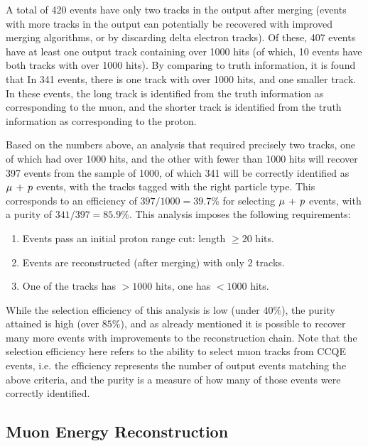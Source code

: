 A total of 420 events have only two tracks in the output after merging (events with more tracks in the output can potentially be recovered with improved merging algorithms, or by discarding delta electron tracks). Of these, 407 events have at least one output track containing over 1000 hits (of which, 10 events have both tracks with over 1000 hits). By comparing to truth information, it is found that In 341 events, there is one track with over 1000 hits, and one smaller track. In these events, the long track is identified from the truth information as corresponding to the muon, and the shorter track is identified from the truth information as corresponding to the proton.

Based on the numbers above, an analysis that required precisely two tracks, one of which had over 1000 hits, and the other with fewer than 1000 hits will recover 397 events from the sample of 1000, of which 341 will be correctly identified as $\mu\,+\,p$ events, with the tracks tagged with the right particle type. This corresponds to an efficiency of $397/1000 = 39.7\%$ for selecting $\mu\,+\,p$ events, with a purity of $341/397 = 85.9\%$. This analysis imposes the following requirements:
\begin{enumerate}
    \item Events pass an initial proton range cut: length $\ge 20$ hits.
    \item Events are reconstructed (after merging) with only $2$ tracks.
    \item One of the tracks has $> 1000$ hits, one has $< 1000$ hits.
\end{enumerate}

While the selection efficiency of this analysis is low (under $40\%$), the purity attained is high (over $85\%$), and as already mentioned it is possible to recover many more events with improvements to the reconstruction chain. Note that the selection efficiency here refers to the ability to select muon tracks from \acs{CCQE} events, i.e. the efficiency represents the number of output events matching the above criteria, and the purity is a measure of how many of those events were correctly identified.

\subsection{Muon Energy Reconstruction}
